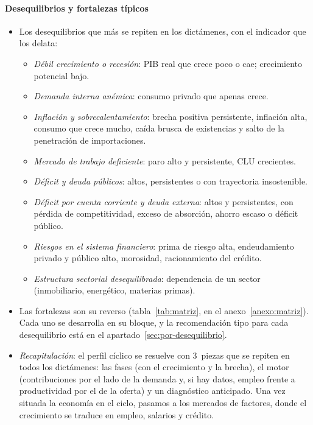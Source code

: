 \documentclass[11pt]{article}
\begin{document}
\paragraph{Desequilibrios y fortalezas típicos}
\begin{itemize}
\item Los desequilibrios que más se repiten en los dictámenes, con el indicador que los delata:
  \begin{itemize}
  \item \emph{Débil crecimiento o recesión}: PIB real que crece poco o cae; crecimiento potencial bajo.
  \item \emph{Demanda interna anémica}: consumo privado que apenas crece.
  \item \emph{Inflación y sobrecalentamiento}: brecha positiva persistente, inflación alta, consumo que crece mucho, caída brusca de existencias y salto de la penetración de importaciones.
  \item \emph{Mercado de trabajo deficiente}: paro alto y persistente, CLU crecientes.
  \item \emph{Déficit y deuda públicos}: altos, persistentes o con trayectoria insostenible.
  \item \emph{Déficit por cuenta corriente y deuda externa}: altos y persistentes, con pérdida de competitividad, exceso de absorción, ahorro escaso o déficit público.
  \item \emph{Riesgos en el sistema financiero}: prima de riesgo alta, endeudamiento privado y público alto, morosidad, racionamiento del crédito.
  \item \emph{Estructura sectorial desequilibrada}: dependencia de un sector (inmobiliario, energético, materias primas).
  \end{itemize}
\item Las fortalezas son su reverso (tabla~\ref{tab:matriz}, en el anexo~\ref{anexo:matriz}). Cada uno se desarrolla en su bloque, y la recomendación tipo para cada desequilibrio está en el apartado~\ref{sec:por-desequilibrio}.
\end{itemize}

\begin{itemize}
\item \emph{Recapitulación}: el perfil cíclico se resuelve con 3~piezas que se repiten en todos los dictámenes: las fases (con el crecimiento y la brecha), el motor (contribuciones por el lado de la demanda y, si hay datos, empleo frente a productividad por el de la oferta) y un diagnóstico anticipado. Una vez situada la economía en el ciclo, pasamos a los mercados de factores, donde el crecimiento se traduce en empleo, salarios y crédito.
\end{itemize}
\end{document}

